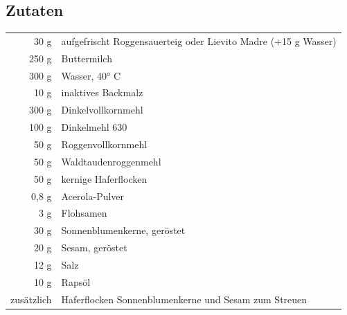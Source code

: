\subsection*{Zutaten}
\begin{tabular}{r l}
          30 g & aufgefrischt Roggensauerteig oder Lievito Madre (+15 g Wasser) \\
         250 g & Buttermilch                                                    \\
         300 g & Wasser, 40° C                                                  \\
          10 g & inaktives Backmalz                                             \\
         300 g & Dinkelvollkornmehl                                             \\
         100 g & Dinkelmehl  630                                                \\
          50 g & Roggenvollkornmehl                                             \\
          50 g & Waldtaudenroggenmehl                                           \\
          50 g & kernige Haferflocken                                           \\
         0,8 g & Acerola-Pulver                                                 \\
           3 g & Flohsamen                                                      \\
          30 g & Sonnenblumenkerne, geröstet                                    \\
          20 g & Sesam, geröstet                                                \\
          12 g & Salz                                                           \\
          10 g & Rapsöl                                                         \\
    zusätzlich & Haferflocken Sonnenblumenkerne und Sesam zum Streuen
\end{tabular}\\

